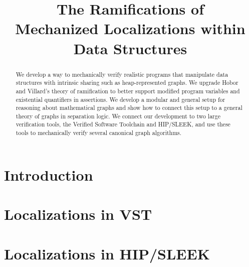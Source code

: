 \documentclass[preprint,10pt]{sigplanconf}
\begin{document}
\setlength{\pdfpageheight}{\paperheight}
\setlength{\pdfpagewidth}{\paperwidth}

%
%

\title{The Ramifications of \\ Mechanized Localizations within Data Structures}
\authorinfo{} {} {}
\maketitle

\begin{abstract}
We develop a way to mechanically verify realistic programs that manipulate data structures with intrinsic sharing such as heap-represented graphs.  We upgrade Hobor and Villard's theory of ramification to better support modified program variables and existential quantifiers in assertions.  We develop a modular and general setup for reasoning about mathematical graphs and show
how to connect this setup to a general theory of graphs in separation logic.  We connect our development to two large verification tools, the Verified Software Toolchain and HIP/SLEEK, and use these tools to mechanically verify several canonical graph algorithms. %
\end{abstract}

\section{Introduction}
\label{sec:intro}



\section{Localizations in VST}
\label{sec:orientation}



\section{Localizations in HIP/SLEEK}
\label{sec:hipsleek} %
\label{sec:hipsleekmark}
\end{document}
